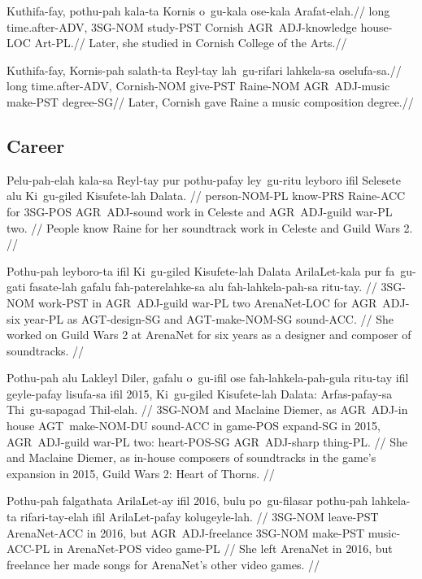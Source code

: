 \ex
\begingl
\gla  Kuthifa-fay, pothu-pah kala-ta  Kornis o~gu-kala ose-kala  Arafat-elah.//
\glb  long time.after-ADV, 3SG-NOM study-PST Cornish AGR~ADJ-knowledge house-LOC Art-PL.//
\glft Later, she studied in Cornish College of the Arts.//
\endgl
\xe

\ex
\begingl
\gla  Kuthifa-fay, Kornis-pah salath-ta Reyl-tay  lah~gu-rifari lahkela-sa oselufa-sa.//
\glb  long time.after-ADV, Cornish-NOM give-PST Raine-NOM  AGR~ADJ-music make-PST degree-SG//
\glft Later, Cornish gave Raine a music composition degree.//
\endgl
\xe

\subsection{Career}
\ex
\begingl
\gla Pelu-pah-elah kala-sa Reyl-tay pur pothu-pafay ley~gu-ritu leyboro ifil Selesete alu Ki~gu-giled Kisufete-lah Dalata. //
\glb person-NOM-PL know-PRS Raine-ACC for 3SG-POS AGR~ADJ-sound work in Celeste and AGR~ADJ-guild war-PL two. //
\glft People know Raine for her soundtrack work in Celeste and Guild Wars 2. //
\endgl
\xe

\ex
\begingl
\gla Pothu-pah leyboro-ta ifil Ki~gu-giled Kisufete-lah Dalata  ArilaLet-kala pur fa~gu-gati fasate-lah gafalu  fah-paterelahke-sa alu fah-lahkela-pah-sa  ritu-tay. //
\glb 3SG-NOM work-PST in AGR~ADJ-guild war-PL two  ArenaNet-LOC for AGR~ADJ-six year-PL as  AGT-design-SG and AGT-make-NOM-SG  sound-ACC. //
\glft She worked on Guild Wars 2 at ArenaNet for six years as a designer and composer of soundtracks. //
\endgl
\xe

\ex
\begingl
\gla Pothu-pah alu Lakleyl Diler, gafalu o~gu-ifil ose fah-lahkela-pah-gula  ritu-tay ifil  geyle-pafay lisufa-sa ifil 2015, Ki~gu-giled Kisufete-lah Dalata: Arfas-pafay-sa  Thi~gu-sapagad Thil-elah. //
\glb 3SG-NOM and Maclaine Diemer, as AGR~ADJ-in house AGT~make-NOM-DU  sound-ACC in  game-POS expand-SG in 2015, AGR~ADJ-guild war-PL two: heart-POS-SG  AGR~ADJ-sharp thing-PL. //
\glft She and Maclaine Diemer, as in-house composers of soundtracks in the game's expansion in 2015, Guild Wars 2: Heart of Thorns. //
\endgl
\xe

\ex
\begingl
\gla Pothu-pah falgathata ArilaLet-ay ifil 2016, bulu po~gu-filasar pothu-pah lahkela-ta rifari-tay-elah ifil ArilaLet-pafay   kolugeyle-lah. //
\glb 3SG-NOM leave-PST ArenaNet-ACC in 2016, but AGR~ADJ-freelance 3SG-NOM make-PST music-ACC-PL in ArenaNet-POS  video game-PL //
\glft She left ArenaNet in 2016, but freelance her made songs for ArenaNet's other video games. //
\endgl
\xe

